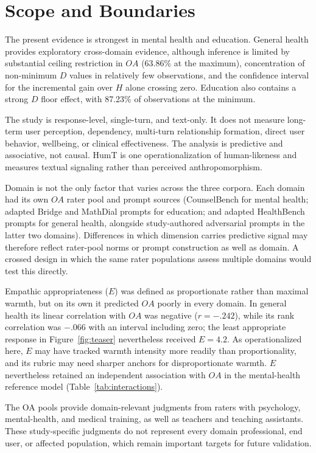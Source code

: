 \documentclass[manuscript,review,anonymous]{acmart}
\begin{document}
\section{Scope and Boundaries}
\label{sec:scope}

The present evidence is strongest in mental health and education. General health provides exploratory cross-domain evidence, although inference is limited by substantial ceiling restriction in $OA$ (63.86\% at the maximum), concentration of non-minimum $D$ values in relatively few observations, and the confidence interval for the incremental gain over $H$ alone crossing zero. Education also contains a strong $D$ floor effect, with 87.23\% of observations at the minimum.

The study is response-level, single-turn, and text-only. It does not measure long-term user perception, dependency, multi-turn relationship formation, direct user behavior, wellbeing, or clinical effectiveness. The analysis is predictive and associative, not causal. HumT is one operationalization of human-likeness and measures textual signaling rather than perceived anthropomorphism.

Domain is not the only factor that varies across the three corpora. Each domain had its own $OA$ rater pool and prompt sources (CounselBench for mental health; adapted Bridge and MathDial prompts for education; and adapted HealthBench prompts for general health, alongside study-authored adversarial prompts in the latter two domains). Differences in which dimension carries predictive signal may therefore reflect rater-pool norms or prompt construction as well as domain. A crossed design in which the same rater populations assess multiple domains would test this directly.

Empathic appropriateness ($E$) was defined as proportionate rather than maximal warmth, but on its own it predicted $OA$ poorly in every domain. In general health its linear correlation with $OA$ was negative ($r=-.242$), while its rank correlation was $-.066$ with an interval including zero; the least appropriate response in Figure~\ref{fig:teaser} nevertheless received $E=4.2$. As operationalized here, $E$ may have tracked warmth intensity more readily than proportionality, and its rubric may need sharper anchors for disproportionate warmth. $E$ nevertheless retained an independent association with $OA$ in the mental-health reference model (Table~\ref{tab:interactions}).

The OA pools provide domain-relevant judgments from raters with psychology, mental-health, and medical training, as well as teachers and teaching assistants. These study-specific judgments do not represent every domain professional, end user, or affected population, which remain important targets for future validation.
\end{document}
